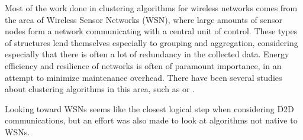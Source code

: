 Most of the work done in clustering algorithms for wireless networks comes from the area of Wireless Sensor Networks (WSN), where large amounts of sensor nodes form a network communicating with a central unit of control. These types of structures lend themselves especially to grouping and aggregation, considering especially that there is often a lot of redundancy in the collected data. Energy efficiency and resilience of networks is often of paramount importance, in an attempt to minimize maintenance overhead. There have been several studies about clustering algorithms in this area, such as \cite{Jiang2009} or \cite{Afsar2014}. 

Looking toward WSNs seems like the closest logical step when considering D2D communications, but an effort was also made to look at algorithms not native to WSNs.